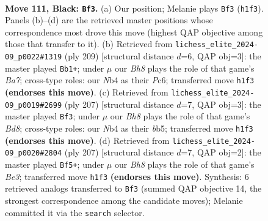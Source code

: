 \documentclass[11pt]{article}
\begin{document}
\clearpage

\begin{figure}[p]\centering
\begin{subfigure}{0.46\textwidth}\centering
\resizebox{\linewidth}{!}{%
\newchessgame
\chessboard[
  setfen={8/8/8/7k/1n1B4/8/5P2/5K1b b - - 68 111},
  showmover=false,
  pgfstyle=straightmove, color=movearrow, markmove={h1-f3}
]}
\caption{}
\end{subfigure}\hfill
\begin{subfigure}{0.46\textwidth}\centering
\resizebox{\linewidth}{!}{%
\newchessgame
\chessboard[
  setfen={4k3/8/2p2PK1/2P5/8/2B5/b7/8 b - - 20 105},
  showmover=false,
  pgfstyle=straightmove, color=movearrow, markmove={a2-b1}
]}
\caption{}
\end{subfigure}
\\[4pt]
\begin{subfigure}{0.46\textwidth}\centering
\resizebox{\linewidth}{!}{%
\newchessgame
\chessboard[
  setfen={8/8/8/1B6/3k4/P7/1K6/3b4 b - - 30 104},
  showmover=false,
  pgfstyle=straightmove, color=movearrow, markmove={d1-f3}
]}
\caption{}
\end{subfigure}\hfill
\begin{subfigure}{0.46\textwidth}\centering
\resizebox{\linewidth}{!}{%
\newchessgame
\chessboard[
  setfen={8/8/4bP2/4B3/8/8/3k4/1K6 b - - 22 104},
  showmover=false,
  pgfstyle=straightmove, color=movearrow, markmove={e6-f5}
]}
\caption{}
\end{subfigure}
\caption{\textbf{Move 111, Black: \texttt{Bf3}.} (a) Our position; Melanie plays \texttt{Bf3} (\texttt{h1f3}). Panels (b)--(d) are the retrieved master positions whose correspondence most drove this move (highest QAP objective among those that transfer to it). (b) Retrieved from \texttt{lichess\_elite\_2024-09\_p0022\#1319} (ply 209) [structural distance $d$=6, QAP obj=3]: the master played \texttt{Bb1+}; under $\mu$ our \emph{Bh8} plays the role of that game's \emph{Ba7}; cross-type roles: our \emph{N}b4 as their \emph{P}c6; transferred move \texttt{h1f3} \textbf{(endorses this move)}. (c) Retrieved from \texttt{lichess\_elite\_2024-09\_p0019\#2699} (ply 207) [structural distance $d$=7, QAP obj=3]: the master played \texttt{Bf3}; under $\mu$ our \emph{Bh8} plays the role of that game's \emph{Bd8}; cross-type roles: our \emph{N}b4 as their \emph{b}b5; transferred move \texttt{h1f3} \textbf{(endorses this move)}. (d) Retrieved from \texttt{lichess\_elite\_2024-09\_p0020\#2804} (ply 207) [structural distance $d$=7, QAP obj=2]: the master played \texttt{Bf5+}; under $\mu$ our \emph{Bh8} plays the role of that game's \emph{Be3}; transferred move \texttt{h1f3} \textbf{(endorses this move)}. Synthesis: 6 retrieved analogs transferred to \texttt{Bf3} (summed QAP objective 14, the strongest correspondence among the candidate moves); Melanie committed it via the \texttt{search} selector.}
\label{fig:thought-m221}
\end{figure}
\end{document}
